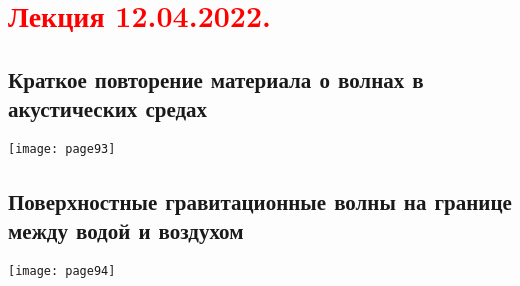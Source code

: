 \documentclass[main.tex]{subfiles}
\begin{document}
\section{\textcolor{red}{Лекция 12.04.2022.}}

\subsection{Краткое повторение материала о волнах в акустических средах}
\texttt{[image: page93]}

\subsection{Поверхностные гравитационные волны на границе между водой и воздухом}
\texttt{[image: page94]}





\end{document}
